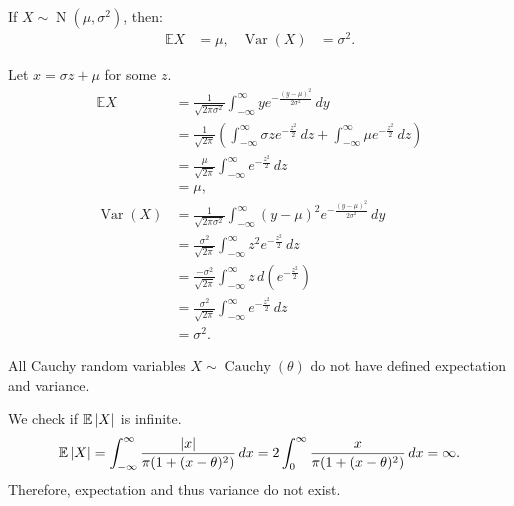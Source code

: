\documentclass{huhtakm-template-book-v2}
\newcommand{\expect}{\mathbb{E}}
\DeclareMathOperator{\N}{N}
\DeclareMathOperator{\Cauchy}{Cauchy}
\DeclareMathOperator{\Var}{Var}
\begin{document}
    \begin{thm}
        \label{Chapter 6 (Theorem) Expectation and Variance of normal distribution}
        If $X \sim \N(\mu,\sigma^{2})$, then:
        \begin{align*}
            \expect{X} &= \mu, & \Var(X) &= \sigma^{2}.
        \end{align*}
    \end{thm}
    \begin{proofing}
        \item Let $x = \sigma z + \mu$ for some $z$.
        \begin{align*}
            \expect{X} &= \frac{1}{\sqrt{2\pi\sigma^{2}}}\int_{-\infty}^{\infty} ye^{-\frac{(y-\mu)^{2}}{2\sigma^{2}}}\,dy\\
            &= \frac{1}{\sqrt{2\pi}}\left(\int_{-\infty}^{\infty}\sigma ze^{-\frac{z^{2}}{2}}\,dz + \int_{-\infty}^{\infty}\mu e^{-\frac{z^{2}}{2}}\,dz\right)\\
            &= \frac{\mu}{\sqrt{2\pi}}\int_{-\infty}^{\infty}e^{-\frac{z^{2}}{2}}\,dz\\
            &= \mu,\\
            \Var(X) &= \frac{1}{\sqrt{2\pi\sigma^{2}}}\int_{-\infty}^{\infty}(y-\mu)^{2}e^{-\frac{(y-\mu)^{2}}{2\sigma^{2}}}\,dy\\
            &= \frac{\sigma^{2}}{\sqrt{2\pi}}\int_{-\infty}^{\infty}z^{2}e^{-\frac{z^{2}}{2}}\,dz\\
            &= \frac{-\sigma^{2}}{\sqrt{2\pi}}\int_{-\infty}^{\infty}z\,d\left(e^{-\frac{z^{2}}{2}}\right)\\
            &= \frac{\sigma^{2}}{\sqrt{2\pi}}\int_{-\infty}^{\infty}e^{-\frac{z^{2}}{2}}\,dz\\
            &= \sigma^{2}.
        \end{align*}
    \end{proofing}
    \begin{thm}
        All Cauchy random variables $X \sim \Cauchy(\theta)$ do not have defined expectation and variance.
    \end{thm}
    \begin{proofing}
        We check if $\expect\abs{X}$ is infinite.
        \begin{equation*}
            \expect\abs{X} = \int_{-\infty}^{\infty}\frac{\abs{x}}{\pi(1+(x-\theta)^{2})}\,dx = 2\int_{0}^{\infty}\frac{x}{\pi(1+(x-\theta)^{2})}\,dx = \infty.
        \end{equation*}
        Therefore, expectation and thus variance do not exist.
    \end{proofing}
\end{document}
